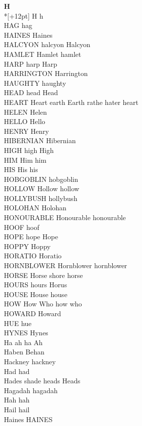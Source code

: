 \vspace{14pt}
\noindent\textbf{\Large H}\\*[+12pt]
H h\\
HAG hag\\
HAINES Haines\\
HALCYON halcyon Halcyon\\
HAMLET Hamlet hamlet\\
HARP harp Harp\\
HARRINGTON Harrington\\
HAUGHTY haughty\\
HEAD head Head\\
HEART Heart earth Earth rathe hater heart\\
HELEN Helen\\
HELLO Hello\\
HENRY Henry\\
HIBERNIAN Hibernian\\
HIGH high High\\
HIM Him him\\
HIS His his\\
HOBGOBLIN hobgoblin\\
HOLLOW Hollow hollow\\
HOLLYBUSH hollybush\\
HOLOHAN Holohan\\
HONOURABLE Honourable honourable\\
HOOF hoof\\
HOPE hope Hope\\
HOPPY Hoppy\\
HORATIO Horatio\\
HORNBLOWER Hornblower hornblower\\
HORSE Horse shore horse\\
HOURS hours Horus\\
HOUSE House house\\
HOW How Who how who\\
HOWARD Howard\\
HUE hue\\
HYNES Hynes\\
Ha ah ha Ah\\
Haben Behan\\
Hackney hackney\\
Had had\\
Hades shade heads Heads\\
Hagadah hagadah\\
Hah hah\\
Hail hail\\
Haines HAINES\\
